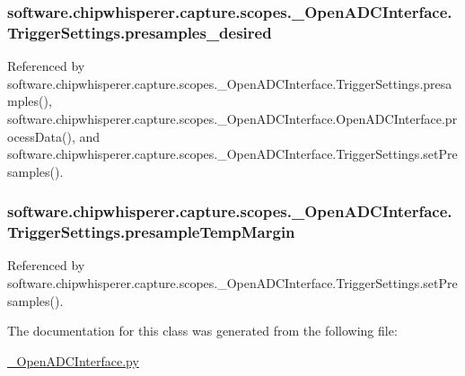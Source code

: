 \subsubsection[{presamples\+\_\+desired}]{\setlength{\rightskip}{0pt plus 5cm}software.\+chipwhisperer.\+capture.\+scopes.\+\_\+\+Open\+A\+D\+C\+Interface.\+Trigger\+Settings.\+presamples\+\_\+desired}\label{classsoftware_1_1chipwhisperer_1_1capture_1_1scopes_1_1__OpenADCInterface_1_1TriggerSettings_a45c60fe381af3e1715ada22bccdf0d2d}


Referenced by software.\+chipwhisperer.\+capture.\+scopes.\+\_\+\+Open\+A\+D\+C\+Interface.\+Trigger\+Settings.\+presamples(), software.\+chipwhisperer.\+capture.\+scopes.\+\_\+\+Open\+A\+D\+C\+Interface.\+Open\+A\+D\+C\+Interface.\+process\+Data(), and software.\+chipwhisperer.\+capture.\+scopes.\+\_\+\+Open\+A\+D\+C\+Interface.\+Trigger\+Settings.\+set\+Presamples().

\hypertarget{classsoftware_1_1chipwhisperer_1_1capture_1_1scopes_1_1__OpenADCInterface_1_1TriggerSettings_a997cc9d58b9fe01447a3c133b1abb071}{}
\subsubsection[{presample\+Temp\+Margin}]{\setlength{\rightskip}{0pt plus 5cm}software.\+chipwhisperer.\+capture.\+scopes.\+\_\+\+Open\+A\+D\+C\+Interface.\+Trigger\+Settings.\+presample\+Temp\+Margin}\label{classsoftware_1_1chipwhisperer_1_1capture_1_1scopes_1_1__OpenADCInterface_1_1TriggerSettings_a997cc9d58b9fe01447a3c133b1abb071}


Referenced by software.\+chipwhisperer.\+capture.\+scopes.\+\_\+\+Open\+A\+D\+C\+Interface.\+Trigger\+Settings.\+set\+Presamples().



The documentation for this class was generated from the following file\+:\begin{DoxyCompactItemize}
\item 
\hyperlink{__OpenADCInterface_8py}{\+\_\+\+Open\+A\+D\+C\+Interface.\+py}\end{DoxyCompactItemize}
